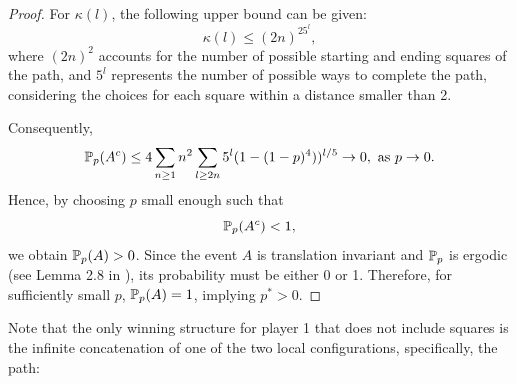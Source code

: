 \begin{proof}
           For $\kappa(l)$, the following upper bound can be given:
           \[
                \kappa(l) \leq (2n)^25^l,
           \]
           where $(2n)^2$ accounts for the number of possible starting and ending squares of the path, and $5^l$ represents the number of possible ways to complete the path, considering the choices for each square within a distance smaller than 2.

           Consequently, 
           \[
                \mathbb{P}_p(A^c) \leq 4 \sum_{n \geq 1} n^2 \sum_{l \geq 2n} 5^l(1 - (1-p)^4))^{l/5} \to 0, \text{ as } p \to 0.
           \]
           Hence, by choosing $p$ small enough such that
           \[
                \mathbb{P}_p(A^c) < 1,
           \]
           we obtain $\mathbb{P}_p(A) > 0$. Since the event $A$ is translation invariant and $\mathbb{P}_p$ is ergodic (see Lemma 2.8 in \cite{DuminilCopin2018}), its probability must be either 0 or 1. Therefore, for sufficiently small $p$, $\mathbb{P}_p(A) = 1$, implying $p^* > 0$.

        \end{proof}
        
        
        Note that the only winning structure for player 1 that does not include squares is the infinite concatenation of one of the two local configurations, specifically, the path:
        \begin{center}
        \end{center}

